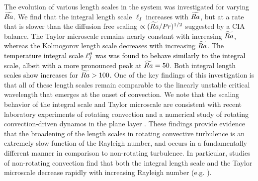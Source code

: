 The evolution of various length scales in the system was investigated for varying $\widetilde{Ra}$. 
We find that the integral length scale $\ell_I$ increases with $\widetilde{Ra}$, but at a rate that is slower than the diffusion free scaling $\propto (\widetilde{Ra}/Pr)^{1/2}$ suggested by a CIA balance. %
The Taylor microscale remains nearly constant with increasing $\widetilde{Ra}$, whereas the Kolmogorov length scale decreases with increasing $\widetilde{Ra}$.
\textcolor{black}{The temperature integral scale $\ell_{I}^{\vartheta}$ was was found to behave similarly to the integral scale, albeit with a more pronounced peak at $\widetilde{Ra} = 50$. Both integral length scales show increases for $\widetilde{Ra}>100$.}
One of the key findings of this investigation is that all of these length scales remain comparable to the linearly unstable critical wavelength that emerges at the onset of convection. 
We note that the scaling behavior of the integral scale and Taylor microscale are consistent with recent laboratory experiments of rotating convection \citep{mM21} and a numerical study of rotating convection-driven dynamos in the plane layer \citep{mY22}. 
These findings provide evidence that the broadening of the length scales in rotating convective turbulence is an extremely slow function of the Rayleigh number, and occurs in a fundamentally different manner in comparison to non-rotating turbulence. 
In particular, studies of non-rotating convection find that both the integral length scale and the Taylor microscale decrease rapidly with increasing Rayleigh number (e.g. \citep{mY21}). 



